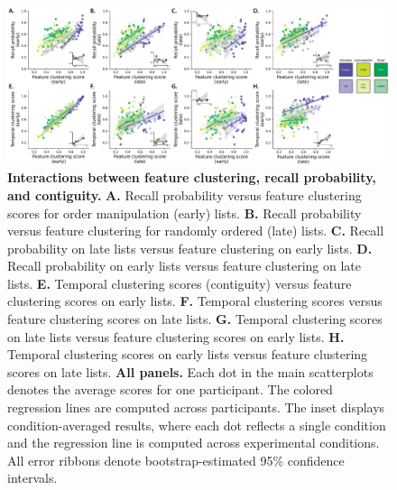 \documentclass[11pt]{article}
\begin{document}
\begin{figure}[tp] \centering
\includegraphics[width=\textwidth]{figures/feature_clustering_vs_accuracy_and_contiguity}

\caption{\textbf{Interactions between feature clustering, recall probability,
and contiguity.} \textbf{A.} Recall probability versus feature clustering
scores for order manipulation (early) lists. \textbf{B.} Recall probability
versus feature clustering for randomly ordered (late) lists. \textbf{C.} Recall
probability on late lists versus feature clustering on early lists. \textbf{D.}
Recall probability on early lists versus feature clustering on late lists.
\textbf{E.} Temporal clustering scores (contiguity) versus feature clustering
scores on early lists. \textbf{F.} Temporal clustering scores versus feature
clustering scores on late lists. \textbf{G.} Temporal clustering scores on late
lists versus feature clustering scores on early lists. \textbf{H.} Temporal
clustering scores on early lists versus feature clustering scores on late
lists. \textbf{All panels.} Each dot in the main scatterplots denotes the
average scores for one participant. The colored regression lines are computed
across participants. The inset displays condition-averaged results, where each
dot reflects a single condition and the regression line is computed across
experimental conditions. All error ribbons denote bootstrap-estimated 95\%
confidence intervals.} \label{fig:clustering-scatterplots} 

\end{figure}
\end{document}
